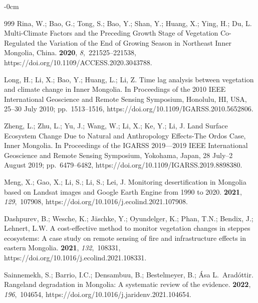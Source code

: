 \documentclass[geosciences,article,accept,pdftex,oneauthor]{Definitions/mdpi}
\begin{document}
\begin{adjustwidth}{-\extralength}{0cm}
\begin{thebibliography}{999}
Rina, W.; Bao, G.; Tong, S.; Bao, Y.; Shan, Y.; Huang, X.; Ying, H.; Du, L.
\newblock Multi-Climate Factors and the Preceding Growth Stage of Vegetation
  Co-Regulated the Variation of the End of Growing Season in Northeast Inner
  Mongolia, China.
 {\bf 2020}, {\em 8},~221525--221538, https://doi.org/10.1109/ACCESS.2020.3043788.

Long, H.; Li, X.; Bao, Y.; Huang, L.; Li, Z.
\newblock Time lag analysis between vegetation and climate change in Inner
  Mongolia.
\newblock In Proceedings of the 2010 IEEE International Geoscience and Remote
  Sensing Symposium, Honolulu, HI, USA,  25--30 July 2010; pp.~1513--1516, https://doi.org/10.1109/IGARSS.2010.5652806.

Zheng, L.; Zhu, L.; Yu, J.; Wang, W.; Li, X.; Ke, Y.; Li, J.
\newblock Land Surface Ecosystem Change Due to Natural and Anthropology
  Effects-The Ordos Case, Inner Mongolia.
\newblock In Proceedings of the IGARSS 2019---2019 IEEE International
  Geoscience and Remote Sensing Symposium, Yokohama, Japan, 28 July--2 August  2019; pp.~6479--6482, https://doi.org/10.1109/IGARSS.2019.8898380.

Meng, X.; Gao, X.; Li, S.; Li, S.; Lei, J.
\newblock Monitoring desertification in Mongolia based on Landsat images and
  Google Earth Engine from 1990 to 2020.
 {\bf 2021}, {\em 129},~107908, https://doi.org/10.1016/j.ecolind.2021.107908.

Dashpurev, B.; Wesche, K.; Jäschke, Y.; Oyundelger, K.; Phan, T.N.; Bendix,
  J.; Lehnert, L.W.
\newblock A cost-effective method to monitor vegetation changes in steppes
  ecosystems: A case study on remote sensing of fire and infrastructure effects
  in eastern Mongolia.
 {\bf 2021}, {\em 132},~108331, https://doi.org/10.1016/j.ecolind.2021.108331.

Sainnemekh, S.; Barrio, I.C.; Densambuu, B.; Bestelmeyer, B.; Ása
  L.~Aradóttir.
\newblock Rangeland degradation in Mongolia: A systematic review of the
  evidence.
 {\bf 2022}, {\em 196},~104654, https://doi.org/10.1016/j.jaridenv.2021.104654.


\end{thebibliography}
\end{adjustwidth}
\end{document}
